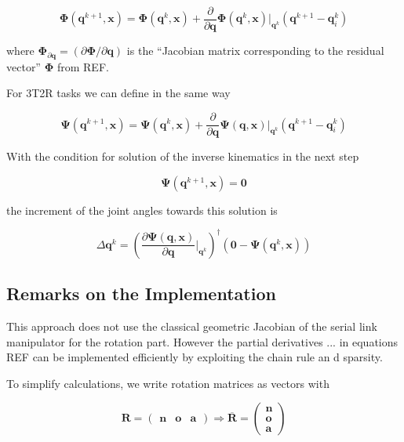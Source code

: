 \documentclass[twocolumn,10pt]{IFTOMM}
\newcommand{\bm}[1]{\boldsymbol{#1}}
\begin{document}
\begin{equation}
\bm{\Phi}(\bm{q}^{k+1},\bm{x}) = 
\bm{\Phi}(\bm{q}^{k},\bm{x})
+
\frac{\partial}{\partial \bm{q}} \bm{\Phi}(\bm{q}^k,\bm{x}) \biggr\rvert_{\bm{q}^k} (\bm{q}^{k+1} - \bm{q}_i^k)
\end{equation}

where $\bm{\Phi}_{\partial\bm{q}}=(\partial \bm{\Phi} / \partial \bm{q})$ is the ``Jacobian matrix corresponding to the residual vector'' $\bm{\Phi}$ from REF.

For 3T2R tasks we can define in the same way
 
\begin{equation}
\bm{\Psi}(\bm{q}^{k+1},\bm{x}) = 
\bm{\Psi}(\bm{q}^{k},\bm{x})
+
\frac{\partial}{\partial \bm{q}} \bm{\Psi}(\bm{q},\bm{x}) \biggr\rvert_{\bm{q}^k} (\bm{q}^{k+1} - \bm{q}_i^k)
\end{equation}

With the condition for solution of the inverse kinematics in the next step

\begin{equation}
\bm{\Psi}(\bm{q}^{k+1},\bm{x})=\bm{0}
\end{equation}

the increment of the joint angles towards this solution is

\begin{equation}
\Delta \bm{q}^k
=
\left(\frac{\partial \bm{\Psi}(\bm{q},\bm{x})}{\partial \bm{q}}\biggr\rvert_{\bm{q}^k}\right)^{\dagger}
(\bm{0} - \bm{\Psi}(\bm{q}^{k},\bm{x}))
\end{equation}  




\subsection{Remarks on the Implementation}
\label{sec:RecEulAng_implement}
This approach does not use the classical geometric Jacobian of the serial link manipulator for the rotation part.
However the partial derivatives ... in equations REF can be implemented efficiently by exploiting the chain rule an d sparsity.

To simplify calculations, we write rotation matrices as vectors with

\begin{equation}
\bm{R}=\begin{pmatrix}
\bm{n} & \bm{o} & \bm{a}
\end{pmatrix}
\Rightarrow
\overline{\bm{R}}=\begin{pmatrix}
\bm{n} \\ \bm{o} \\ \bm{a}
\end{pmatrix}
\end{equation}
\end{document}
